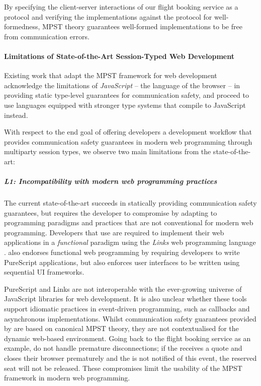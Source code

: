 By specifying the client-server interactions of 
our flight booking service as a protocol 
and verifying the implementations against 
the protocol for well-formedness, 
MPST theory guarantees well-formed 
implementations to be free from communication errors.

\paragraph{Limitations of State-of-the-Art Session-Typed Web Development}
Existing work \cite{MVU2020,PureScript2019} that 
adapt the MPST framework for web development
acknowledge the limitations of \textit{JavaScript} 
-- the language of the browser --
in providing static type-level guarantees
for communication safety, 
and proceed to use
languages equipped with stronger type systems that 
compile to JavaScript instead.

With respect to the end goal of 
offering developers a development workflow
that provides communication safety guarantees in modern
web programming through multiparty session types,
we observe two main limitations from the state-of-the-art:

\subparagraph{L1: 
Incompatibility with modern web programming practices}

The current state-of-the-art succeeds in statically
providing communication safety guarantees,
but requires the developer to compromise by adapting
to programming paradigms and practices that are not
conventional for modern web programming.
Developers that use \cite{MVU2020} are required
to implement their web applications in a \textit{functional} 
paradigm using the \textit{Links} 
web programming language \cite{LINKS}.
\cite{PureScript2019} also endorses
functional web programming by requiring developers to
write PureScript \cite{PureScript} applications, but also
enforces user interfaces to be written using 
sequential UI frameworks.

PureScript and Links are not interoperable
with the ever-growing universe of JavaScript libraries for
web development.
It is also unclear whether these tools support idiomatic
practices in event-driven programming, such as callbacks
and asynchronous implementations.
Whilst communication safety guarantees provided by
\cite{PureScript2019,MVU2020} are based on
canonical MPST theory, they are not contextualised
for the dynamic web-based environment.
Going back to the flight booking service as an example,
\cite{PureScript2019,MVU2020} do not handle premature
disconnections; if the  receives a quote
and closes their browser prematurely and the 
is not notified of this event, 
the reserved seat will not be released.
These compromises limit the usability of the MPST framework
in modern web programming.

